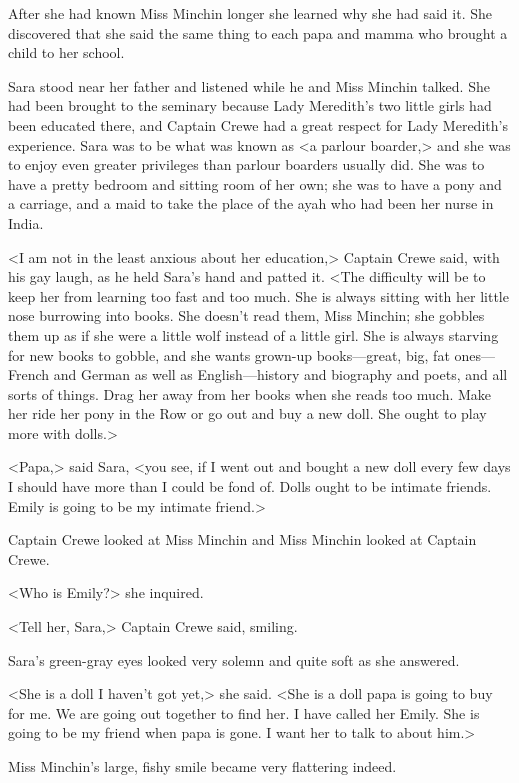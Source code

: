 After she had known Miss Minchin longer she learned why she had said it. She discovered that she said the same thing to each papa and mamma who brought a child to her school.

Sara stood near her father and listened while he and Miss Minchin talked. She had been brought to the seminary because Lady Meredith's two little girls had been educated there, and Captain Crewe had a great respect for Lady Meredith's experience. Sara was to be what was known as <a parlour boarder,> and she was to enjoy even greater privileges than parlour boarders usually did. She was to have a pretty bedroom and sitting room of her own; she was to have a pony and a carriage, and a maid to take the place of the ayah who had been her nurse in India.

<I am not in the least anxious about her education,> Captain Crewe said, with his gay laugh, as he held Sara's hand and patted it. <The difficulty will be to keep her from learning too fast and too much. She is always sitting with her little nose burrowing into books. She doesn't read them, Miss Minchin; she gobbles them up as if she were a little wolf instead of a little girl. She is always starving for new books to gobble, and she wants grown-up books—great, big, fat ones—French and German as well as English—history and biography and poets, and all sorts of things. Drag her away from her books when she reads too much. Make her ride her pony in the Row or go out and buy a new doll. She ought to play more with dolls.>

<Papa,> said Sara, <you see, if I went out and bought a new doll every few days I should have more than I could be fond of. Dolls ought to be intimate friends. Emily is going to be my intimate friend.>

Captain Crewe looked at Miss Minchin and Miss Minchin looked at Captain Crewe.

<Who is Emily?> she inquired.

<Tell her, Sara,> Captain Crewe said, smiling.

Sara's green-gray eyes looked very solemn and quite soft as she answered.

<She is a doll I haven't got yet,> she said. <She is a doll papa is going to buy for me. We are going out together to find her. I have called her Emily. She is going to be my friend when papa is gone. I want her to talk to about him.>

Miss Minchin's large, fishy smile became very flattering indeed.

